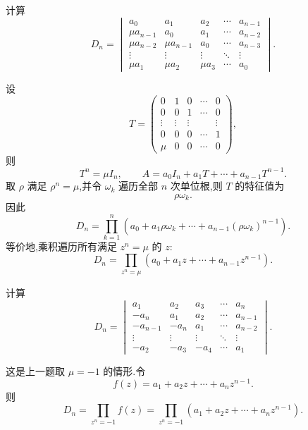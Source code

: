 \begin{example}
计算
\[
D_n=
\begin{vmatrix}
a_0&a_1&a_2&\cdots&a_{n-1}\\
\mu a_{n-1}&a_0&a_1&\cdots&a_{n-2}\\
\mu a_{n-2}&\mu a_{n-1}&a_0&\cdots&a_{n-3}\\
\vdots&\vdots&\vdots&\ddots&\vdots\\
\mu a_1&\mu a_2&\mu a_3&\cdots&a_0
\end{vmatrix}.
\]
\end{example}
\exampleblank

\begin{solution}
设
\[
T=
\begin{pmatrix}
0&1&0&\cdots&0\\
0&0&1&\cdots&0\\
\vdots&\vdots&\vdots&&\vdots\\
0&0&0&\cdots&1\\
\mu&0&0&\cdots&0
\end{pmatrix},
\]
则
\[
T^n=\mu I_n,
\qquad
A=a_0I_n+a_1T+\cdots+a_{n-1}T^{n-1}.
\]
取 $\rho$ 满足 $\rho^n=\mu$,并令 $\omega_k$ 遍历全部 $n$ 次单位根,则 $T$ 的特征值为
\[
\rho\omega_k.
\]
因此
\[
\boxed{
D_n
=
\prod\limits_{k=1}^{n}
\left(
a_0+a_1\rho\omega_k+\cdots+a_{n-1}(\rho\omega_k)^{n-1}
\right)
}.
\]
等价地,乘积遍历所有满足 $z^n=\mu$ 的 $z$:
\[
D_n
=
\prod_{z^n=\mu}
\left(
a_0+a_1z+\cdots+a_{n-1}z^{n-1}
\right).
\]
\end{solution}


\begin{example}
计算
\[
D_n=
\begin{vmatrix}
a_1&a_2&a_3&\cdots&a_n\\
-a_n&a_1&a_2&\cdots&a_{n-1}\\
-a_{n-1}&-a_n&a_1&\cdots&a_{n-2}\\
\vdots&\vdots&\vdots&\ddots&\vdots\\
-a_2&-a_3&-a_4&\cdots&a_1
\end{vmatrix}.
\]
\end{example}
\exampleblank

\begin{solution}
这是上一题取 $\mu=-1$ 的情形.令
\[
f(z)=a_1+a_2z+\cdots+a_nz^{n-1}.
\]
则
\[
\boxed{
D_n
=
\prod_{z^n=-1}f(z)
=
\prod_{z^n=-1}
\left(
a_1+a_2z+\cdots+a_nz^{n-1}
\right)
}.
\]
\end{solution}
